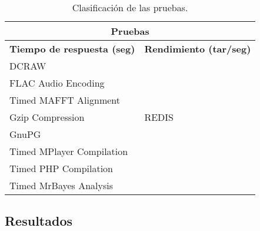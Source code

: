 \documentclass[12pt, letterpaper]{article}
\begin{document}
                        \begin{table}[htb]
                                \centering
                                \begin{tabular}{|l|l|}
                                \hline
                                        \multicolumn{2}{|c|}{\textbf{Pruebas}} \\ 
                                        \hline \hline
                                        \hspace{0.2cm} \textbf{Tiempo de respuesta (seg)} & \textbf{Rendimiento (tar/seg)} \\ \hline     
                                        \hspace{1.7cm}           DCRAW           & \\ 
                                        \hspace{.3cm}     FLAC Audio Encoding    &   \\ 
                                        \hspace{.1cm}    Timed MAFFT Alignment   & \\
                                        \hspace{.9cm}      Gzip Compression      & \hspace{1.3cm} REDIS \\ 
                                        \hspace{2cm}            GnuPG            & \\ 
                                        \hspace{0cm}  Timed MPlayer Compilation  &  \\
                                        \hspace{.2cm}   Timed PHP Compilation    &  \\
                                        \hspace{.2cm}  Timed MrBayes Analysis    & \\
                                        \hline
                                \end{tabular}
                                \caption{Clasificación de las pruebas.}
                        \end{table}

                \subsection{Resultados}
\end{document}
